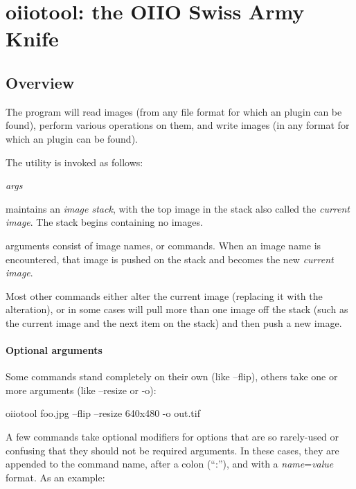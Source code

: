 \chapter{{\kw oiiotool}: the OIIO Swiss Army Knife}
\label{chap:oiiotool}

\section{Overview}


The \oiiotool program will read images (from any file format for which
an \ImageInput plugin can be found), perform various operations on them,
and write images (in any format for which an \ImageOutput plugin can be
found).

The \oiiotool utility is invoked as follows:

\medskip

\hspace{0.25in} \oiiotool \emph{args}

\medskip

\oiiotool maintains an \emph{image stack}, with the top image in the
stack also called the \emph{current image}.  The stack begins containing
no images.

\oiiotool arguments consist of image names, or commands.  When an
image name is encountered, that image is pushed on the stack and becomes
the new \emph{current image}.

Most other commands either alter the current image (replacing it with
the alteration), or in some cases will pull more than one image off the
stack (such as the current image and the next item on the stack) and
then push a new image.

\subsubsection*{Optional arguments}

Some commands stand completely on their own (like {\cf --flip}), others
take one or more arguments (like {\cf --resize} or {\cf -o}):

\smallskip
\hspace{0.25in} {\cf oiiotool foo.jpg --flip --resize 640x480 -o out.tif}
\smallskip

A few commands take optional modifiers for options that are so
rarely-used or confusing that they should not be required arguments.
In these cases, they are appended to the command name, after a colon
(``{\cf :}''), and with a \emph{name}{\cf =}\emph{value} format.  As
an example:


